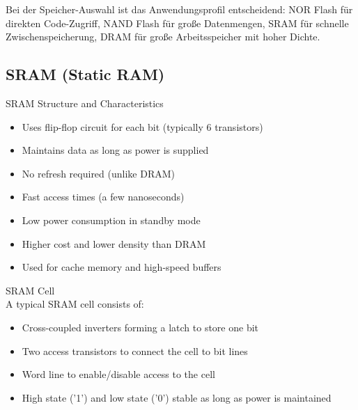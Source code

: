 \begin{remark}
    Bei der Speicher-Auswahl ist das Anwendungsprofil entscheidend: NOR Flash für direkten Code-Zugriff, NAND Flash für große Datenmengen, SRAM für schnelle Zwischenspeicherung, DRAM für große Arbeitsspeicher mit hoher Dichte.
\end{remark}

\multend

\subsection{SRAM (Static RAM)}


\begin{concept}{SRAM Structure and Characteristics}
\begin{itemize}
    \item Uses flip-flop circuit for each bit (typically 6 transistors)
    \item Maintains data as long as power is supplied
    \item No refresh required (unlike DRAM)
    \item Fast access times (a few nanoseconds)
    \item Low power consumption in standby mode
    \item Higher cost and lower density than DRAM
    \item Used for cache memory and high-speed buffers
\end{itemize}
\end{concept}

\begin{definition}{SRAM Cell}\\
A typical SRAM cell consists of:
\begin{itemize}
    \item Cross-coupled inverters forming a latch to store one bit
    \item Two access transistors to connect the cell to bit lines
    \item Word line to enable/disable access to the cell
    \item High state ('1') and low state ('0') stable as long as power is maintained
\end{itemize}
\end{definition}

